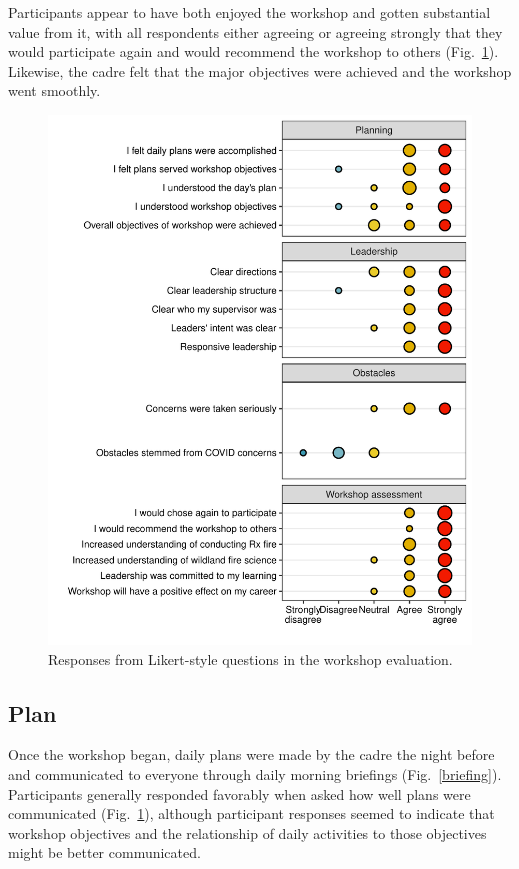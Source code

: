 \documentclass[fire,article,submit,moreauthors,pdftex]{Definitions/mdpi}
\begin{document}
Participants appear to have both enjoyed the workshop and gotten substantial value from it, with all respondents either agreeing or agreeing strongly that they would participate again and would recommend the workshop to others (Fig.~\ref{likert}).
Likewise, the cadre felt that the major objectives were achieved and the workshop went smoothly.

\begin{figure}
\centering
\includegraphics[width=1\columnwidth]{likert_gg-1.pdf}
\caption{Responses from Likert-style questions in the workshop evaluation. \label{likert}}
\end{figure}

\subsection{Plan}

Once the workshop began, daily plans were made by the cadre the night before and communicated to everyone through daily morning briefings (Fig.~\ref{briefing}).
Participants generally responded favorably when asked how well plans were communicated (Fig.~\ref{likert}), although participant responses seemed to indicate that workshop objectives and the relationship of daily activities to those objectives might be better communicated.
\end{document}

